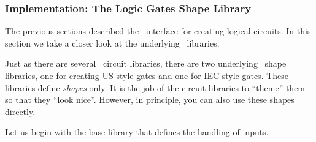 \subsubsection{Implementation: The Logic Gates Shape Library}

The previous sections described the \tikzname\ interface for creating logical
circuits. In this section we take a closer look at the underlying \pgfname\
libraries.

Just as there are several \tikzname\ circuit libraries, there are two
underlying \pgfname\ shape libraries, one for creating US-style gates and one
for IEC-style gates. These libraries define \emph{shapes} only. It is the job
of the circuit libraries to ``theme'' them so that they ``look nice''. However,
in principle, you can also use these shapes directly.

Let us begin with the base library that defines the handling of inputs.

